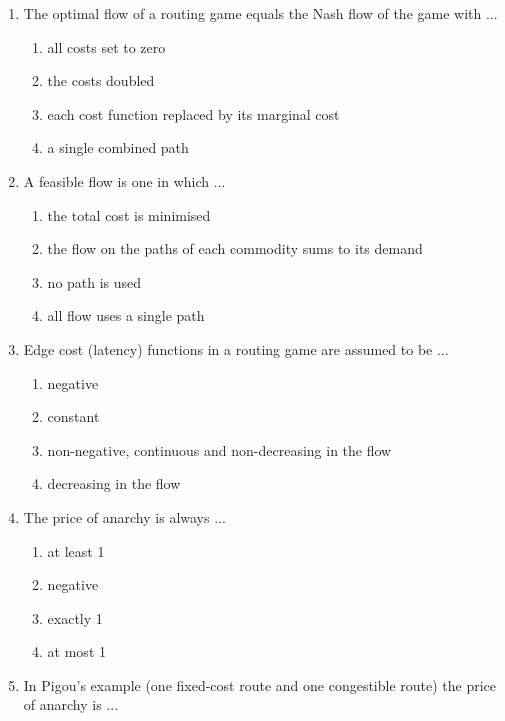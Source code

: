 \documentclass[11pt]{article}
\begin{document}
\begin{enumerate}[itemsep=6pt]
\begin{enumerate}
    \item the optimal flow
    \item a flow that uses no congested edges
    \item never an equilibrium
    \item a Nash flow
  \end{enumerate}
  \item The optimal flow of a routing game equals the Nash flow of the game with ...
  \begin{enumerate}
    \item all costs set to zero
    \item the costs doubled
    \item each cost function replaced by its marginal cost
    \item a single combined path
  \end{enumerate}
  \item A feasible flow is one in which ...
  \begin{enumerate}
    \item the total cost is minimised
    \item the flow on the paths of each commodity sums to its demand
    \item no path is used
    \item all flow uses a single path
  \end{enumerate}
  \item Edge cost (latency) functions in a routing game are assumed to be ...
  \begin{enumerate}
    \item negative
    \item constant
    \item non-negative, continuous and non-decreasing in the flow
    \item decreasing in the flow
  \end{enumerate}
  \item The price of anarchy is always ...
  \begin{enumerate}
    \item at least 1
    \item negative
    \item exactly 1
    \item at most 1
  \end{enumerate}
  \item In Pigou's example (one fixed-cost route and one congestible route) the price of anarchy is ...
  \begin{enumerate}

\end{enumerate}
\end{enumerate}
\end{document}
